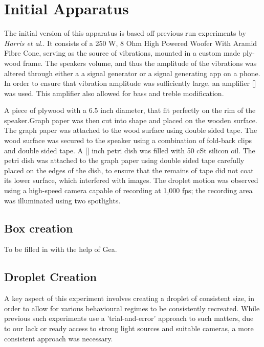 \section{Initial Apparatus}
The initial version of this apparatus is based  off previous run experiments by \textit{Harris et al.}. It consists of a 250 W, 8 Ohm High Powered Woofer With Aramid Fibre Cone, serving as the source of vibrations, mounted in a custom made ply-wood frame. The speakers volume, and thus the amplitude of the vibrations was altered through either a a signal generator or a signal generating app on a phone. In order to ensure that vibration amplitude was sufficiently large, an amplifier [] was used. This amplifier also allowed for bass and treble modification. 

A piece of plywood with a 6.5 inch diameter, that fit perfectly on the rim of the speaker.Graph paper was then cut into shape and placed on the wooden surface. The graph paper was attached to the wood surface using double sided tape. The wood surface was secured to the speaker using a combination of fold-back clips and double sided tape. A [] inch petri dish was filled with 50 cSt silicon oil. The petri dish was attached to the graph paper using double sided tape carefully placed on the edges of the dish, to ensure that the remains of tape did not coat its lower surface, which interfered with images. The droplet motion was observed using a high-speed camera capable of recording at 1,000 fps; the recording area was illuminated using two spotlights. 

\subsection{Box creation}
To be filled in with the help of Gea.\\ 


\subsection{Droplet Creation}
A key aspect of this experiment involves creating a droplet of consistent size, in order to allow for various behavioural regimes to be consistently recreated. While previous such experiments use a 'trial-and-error' approach to such matters, due to our lack or ready access to strong light sources and suitable cameras, a more consistent approach was necessary.

